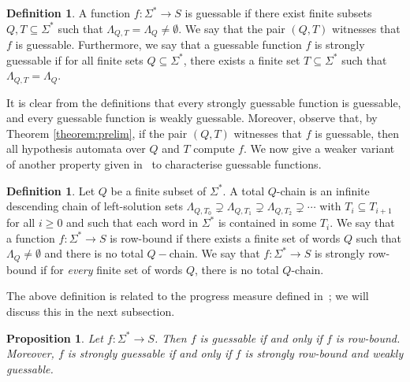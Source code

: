 \documentclass[10pt,a4paper]{amsart}
\newtheorem{prop}[thm]{Proposition}
\theoremstyle{definition}
\newtheorem{defi}[thm]{Definition}
\numberwithin{equation}{section}
\numberwithin{theorem}{section}
\begin{document}
\begin{defi}
A function $f: \Sigma^* \rightarrow S$ is guessable if there exist finite subsets $Q, T \subseteq \Sigma^*$ such that $\Lambda_{Q,T} = \Lambda_{Q} \neq \emptyset$. We say that the pair $(Q,T)$ witnesses that $f$ is guessable. Furthermore, we say that a guessable function $f$ is strongly guessable if for all finite sets $Q \subseteq \Sigma^*$, there exists a finite set $T \subseteq \Sigma^*$ such that $\Lambda_{Q,T} = \Lambda_{Q}$.
\end{defi}

It is clear from the definitions that every strongly guessable function is guessable, and every guessable function is weakly guessable. Moreover, observe that, by Theorem \ref{theorem:prelim}, if the pair $(Q, T)$ witnesses that $f$ is guessable, then all hypothesis automata over $Q$ and $T$ compute $f$.
We now give a weaker variant of another property given in~\cite{HKRS20} to characterise guessable functions.

\begin{defi}
Let $Q$ be a finite subset of $\Sigma^*$.
A total $Q$-chain is an infinite descending chain of left-solution sets $\Lambda_{Q, T_0} \supsetneq \Lambda_{Q, T_1} \supsetneq \Lambda_{Q, T_2} \supsetneq \cdots$  with $T_i \subseteq T_{i+1}$ for all $i \geq 0$ and such that each word in  $\Sigma^*$ is contained in some $T_i$.
We say that a function $f: \Sigma^* \rightarrow S$ is row-bound if there exists a finite set of words $Q$ such that 
$\Lambda_{Q} \neq \emptyset$
 and there is no total $Q-$chain.
We say that $f: \Sigma^* \rightarrow S$ is strongly row-bound if for \emph{every} finite set of words $Q$, there is no total $Q$-chain.
\end{defi}

The above definition is related to the progress measure defined in~\cite[Definition 11]{HKRS20}; we will discuss this in the next subsection.


\begin{prop}
\label{prop:guessable}
Let $f:\Sigma^* \to S$. Then $f$ is guessable if and only if $f$ is row-bound. Moreover, $f$ is strongly guessable if and only if $f$ is strongly row-bound and weakly guessable.
\end{prop}
\end{document}
